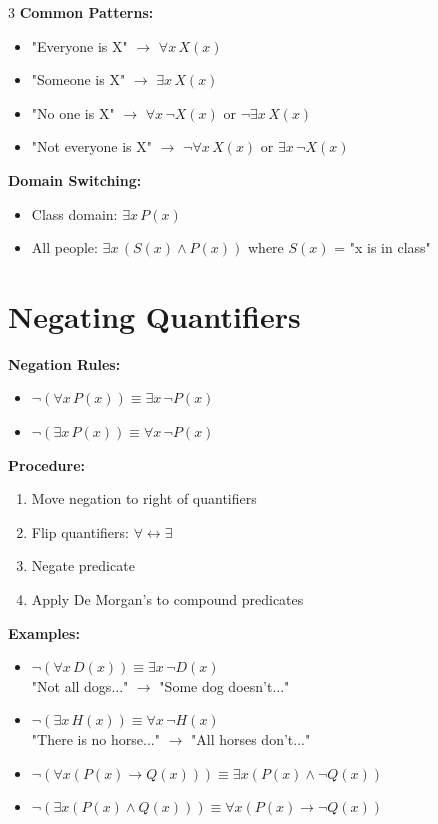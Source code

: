 \documentclass[8pt]{article}
\begin{document}
\begin{multicols}{3}
\textbf{Common Patterns:}
\begin{itemize}[nosep]
\item "Everyone is X" $\to$ $\forall x\, X(x)$
\item "Someone is X" $\to$ $\exists x\, X(x)$
\item "No one is X" $\to$ $\forall x\, \neg X(x)$ or $\neg \exists x\, X(x)$
\item "Not everyone is X" $\to$ $\neg \forall x\, X(x)$ or $\exists x\, \neg X(x)$
\end{itemize}

\textbf{Domain Switching:}
\begin{itemize}[nosep]
\item Class domain: $\exists x\, P(x)$
\item All people: $\exists x\, (S(x) \land P(x))$ where $S(x)$ = "x is in class"
\end{itemize}

\section*{Negating Quantifiers}
\textbf{Negation Rules:}
\begin{itemize}[nosep]
\item $\neg(\forall x\, P(x)) \equiv \exists x\, \neg P(x)$
\item $\neg(\exists x\, P(x)) \equiv \forall x\, \neg P(x)$
\end{itemize}

\textbf{Procedure:}
\begin{enumerate}[nosep]
\item Move negation to right of quantifiers
\item Flip quantifiers: $\forall \leftrightarrow \exists$
\item Negate predicate
\item Apply De Morgan's to compound predicates
\end{enumerate}

\textbf{Examples:}
\begin{itemize}[nosep]
\item $\neg(\forall x\, D(x)) \equiv \exists x\, \neg D(x)$
  \\ "Not all dogs..." $\to$ "Some dog doesn't..."
\item $\neg(\exists x\, H(x)) \equiv \forall x\, \neg H(x)$
  \\ "There is no horse..." $\to$ "All horses don't..."
\item $\neg(\forall x (P(x) \to Q(x))) \equiv \exists x (P(x) \land \neg Q(x))$
\item $\neg(\exists x (P(x) \land Q(x))) \equiv \forall x (P(x) \to \neg Q(x))$
\end{itemize}


\end{multicols}
\end{document}
